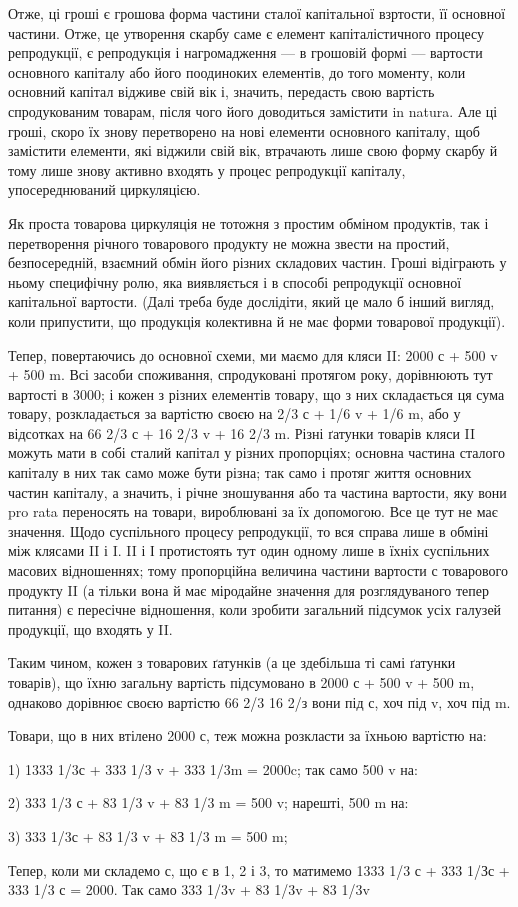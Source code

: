 Отже, ці гроші є грошова форма частини сталої капітальної взртости,
її основної частини. Отже, це утворення скарбу саме є елемент капіталістичного
процесу репродукції, є репродукція і нагромадження — в грошовій
формі — вартости основного капіталу або його поодиноких елементів,
до того моменту, коли основний капітал відживе свій вік і, значить, передасть
свою вартість спродукованим товарам, після чого його доводиться
замістити in natura. Але ці гроші, скоро їх знову перетворено на нові
елементи основного капіталу, щоб замістити елементи, які віджили свій
вік, втрачають лише свою форму скарбу й тому лише знову активно
входять у процес репродукції капіталу, упосереднюваний циркуляцією.

Як проста товарова циркуляція не тотожня з простим обміном продуктів,
так і перетворення річного товарового продукту не можна звести на
простий, безпосередній, взаємний обмін його різних складових частин.
Гроші відіграють у ньому специфічну ролю, яка виявляється і в способі
репродукції основної капітальної вартости. (Далі треба буде дослідіти,
який це мало б інший вигляд, коли припустити, що продукція колективна
й не має форми товарової продукції).

Тепер, повертаючись до основної схеми, ми маємо для кляси II:
2000 с + 500 v + 500 m. Всі засоби споживання, спродуковані протягом
року, дорівнюють тут вартості в 3000; і кожен з різних елементів товару,
що з них складається ця сума товару, розкладається за вартістю своєю
на 2/3 с + 1/6 v + 1/6 m, або у відсотках на 66 2/3 с + 16 2/3 v + 16 2/3 m.
Різні ґатунки товарів кляси II можуть мати в собі сталий капітал у
різних пропорціях; основна частина сталого капіталу в них так само
може бути різна; так само і протяг життя основних частин капіталу, а
значить, і річне зношування або та частина вартости, яку вони pro rata
переносять на товари, вироблювані за їх допомогою. Все це тут не має
значення. Щодо суспільного процесу репродукції, то вся справа лише в
обміні між клясами II і I. II і І протистоять тут один одному лише в
їхніх суспільних масових відношеннях; тому пропорційна величина частини
вартости с товарового продукту II (а тільки вона й має міродайне
значення для розглядуваного тепер питання) є пересічне відношення, коли
зробити загальний підсумок усіх галузей продукції, що входять у II.

Таким чином, кожен з товарових ґатунків (а це здебільша ті самі
ґатунки товарів), що їхню загальну вартість підсумовано в 2000 с + 500 v +
500 m, однаково дорівнює своєю вартістю 66 2/3%
16 2/з%
вони під с, хоч під v, хоч під m.

Товари, що в них втілено 2000 с, теж можна розкласти за їхньою
вартістю на:

1) 1333 1/3с + 333 1/3 v + 333 1/3m = 2000c; так само 500 v на:

2) 333 1/3 с + 83 1/3 v + 83 1/3 m = 500 v; нарешті, 500 m на:

3) 333 1/3с + 83 1/3 v + 8З 1/3 m = 500 m;

Тепер, коли ми складемо с, що є в 1, 2 і 3, то матимемо 1333 1/3 с
+ 333 1/Зс + 333 1/3 с = 2000. Так само 333 1/3v + 83 1/3v + 83 1/3v
